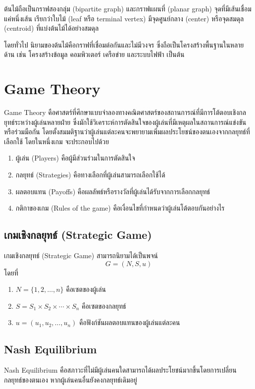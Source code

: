 ต้นไม้ถือเป็นกราฟสองกลุ่ม (bipartite graph) และกราฟแผนที่ (planar graph) จุดที่มีเส้นเชื่อมแค่หนึ่งเส้น เรียกว่าใบไม้ (leaf หรือ terminal vertex) มีจุดศูนย์กลาง (center) หรือจุดสมดุล (centroid) ที่แบ่งต้นไม้ได้อย่างสมดุล  

โดยทั่วไป นิยามของต้นไม้คือกราฟที่เชื่อมต่อกันและไม่มีวงจร ซึ่งถือเป็นโครงสร้างพื้นฐานในหลายด้าน เช่น โครงสร้างข้อมูล คอมพิวเตอร์ เครือข่าย และระบบไฟฟ้า เป็นต้น

\section{Game Theory}
Game Theory คือศาสตร์ที่ศึกษาแบบจำลองทางคณิตศาสตร์ของสถานการณ์ที่มีการโต้ตอบเชิงกลยุทธ์ระหว่างผู้เล่นหลายฝ่าย ซึ่งมักใช้วิเคราะห์การตัดสินใจของผู้เล่นที่มีเหตุผลในสถานการณ์แข่งขันหรือร่วมมือกัน โดยตั้งสมมติฐานว่าผู้เล่นแต่ละคนจะพยายามเพิ่มผลประโยชน์ของตนเองจากกลยุทธ์ที่เลือกใช้ โดยในหนึ่งเกม จะประกอบไปด้วย

\begin{enumerate}
  \item ผู้เล่น (Players) คือผู้มีส่วนร่วมในการตัดสินใจ
  \item กลยุทธ์ (Strategies) คือทางเลือกที่ผู้เล่นสามารถเลือกใช้ได้
  \item ผลตอบแทน (Payoffs) คือผลลัพธ์หรือรางวัลที่ผู้เล่นได้รับจากการเลือกกลยุทธ์
  \item กติกาของเกม (Rules of the game) คือเงื่อนไขที่กำหนดว่าผู้เล่นโต้ตอบกันอย่างไร
\end{enumerate}

\subsection{เกมเชิงกลยุทธ์ (Strategic Game)}
เกมเชิงกลยุทธ์ (Strategic Game) สามารถนิยามได้เป็นพจน์
\[
G = (N, S, u)
\]
โดยที่
\begin{enumerate}
  \item \( N = \{1, 2, \ldots, n\} \) คือเซตของผู้เล่น
  \item \( S = S_1 \times S_2 \times \cdots \times S_n \) คือเซตของกลยุทธ์
  \item \( u = (u_1, u_2, \ldots, u_n) \) คือฟังก์ชันผลตอบแทนของผู้เล่นแต่ละคน
\end{enumerate}

\subsection{Nash Equilibrium}
Nash Equilibrium คือสภาวะที่ไม่มีผู้เล่นคนใดสามารถได้ผลประโยชน์มากขึ้นโดยการเปลี่ยนกลยุทธ์ของตนเอง หากผู้เล่นคนอื่นยังคงกลยุทธ์เดิมอยู่

